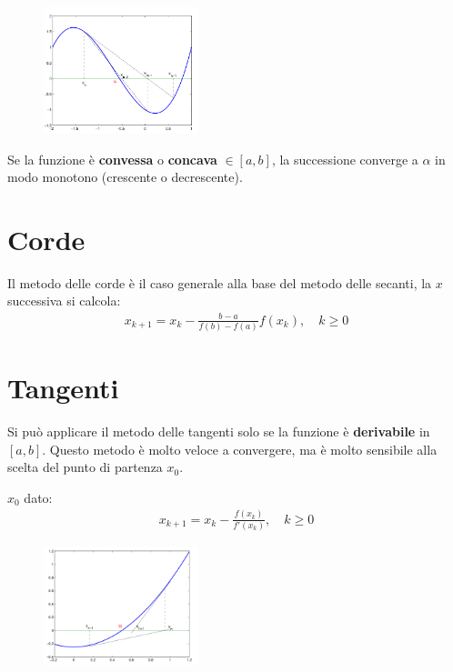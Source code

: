 \begin{figure}[h!]
  \centering
  \includegraphics[width=0.4\textwidth]{images/secandi.png}
\end{figure}


Se la funzione \`e \textbf{convessa} o \textbf{concava} $\in [a, b]$, la successione converge a $\alpha$ in modo 
monotono (crescente o decrescente).

\section{Corde}
Il metodo delle corde \`e il caso generale alla base del metodo delle secanti, la $x$ successiva si calcola:
\begin{align}
  x_{k+1} = x_k - \frac{b-a}{f(b)-f(a)} f(x_k), \quad k \geq 0
\end{align}


\section{Tangenti}
Si pu\`o applicare il metodo delle tangenti solo se la funzione \`e \textbf{derivabile} in $[a, b]$.
Questo metodo \`e molto veloce a convergere, ma \`e molto sensibile alla scelta del punto di partenza $x_0$.


$x_0$ dato:
\begin{align}
  x_{k+1} = x_k - \frac{f(x_k)}{f'(x_k)}, \quad k \geq 0
\end{align}


\begin{figure}[h!]
  \centering
  \includegraphics[width=0.4\textwidth]{images/tangenti.png}
\end{figure}

